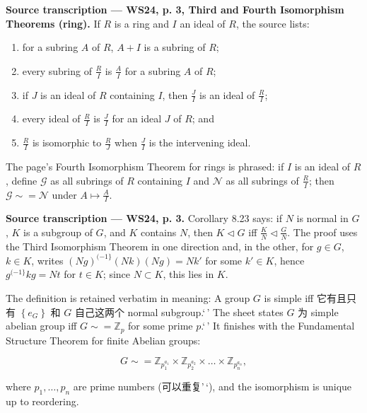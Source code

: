 \textbf{Source transcription --- WS24, p. 3, Third and Fourth Isomorphism Theorems (ring).} If \(R\) is a ring and \(I\) an ideal of \(R\), the source lists:

\begin{enumerate}
\tightlist
\item
  for a subring \(A\) of \(R\), \(A + I\) is a subring of \(R\);
\item
  every subring of \(\frac{R}{I}\) is \(\frac{A}{I}\) for a subring \(A\) of \(R\);
\item
  if \(J\) is an ideal of \(R\) containing \(I\), then \(\frac{J}{I}\) is an ideal of \(\frac{R}{I}\);
\item
  every ideal of \(\frac{R}{I}\) is \(\frac{J}{I}\) for an ideal \(J\) of \(R\); and
\item
  \(\frac{R}{I}\) is isomorphic to \(\frac{R}{J}\) when \(\frac{J}{I}\) is the intervening ideal.
\end{enumerate}

The page's Fourth Isomorphism Theorem for rings is phrased: if \(I\) is an ideal of \(R\), define \(\mathcal{G}\) as all subrings of \(R\) containing \(I\) and \(\mathcal{N}\) as all subrings of \(\frac{R}{I}\); then \(\mathcal{G} \sim = \mathcal{N}\) under \(A\mapsto\frac{A}{I}\).

\textbf{Source transcription --- WS24, p. 3.} Corollary 8.23 says: if \(N\) is normal in \(G\), \(K\) is a subgroup of \(G\), and \(K\) contains \(N\), then \(K \lhd G\) iff \(\frac{K}{N} \lhd \frac{G}{N}\). The proof uses the Third Isomorphism Theorem in one direction and, in the other, for \(g \in G\), \(k \in K\), writes \(\left( {Ng} \right)^{({- 1}\}}\left( {Nk} \right)\left( {Ng} \right) = Nk'\) for some \(k' \in K\), hence \(g^{({- 1}\}}kg = Nt\) for \(t \in K\); since \(N \subset K\), this lies in \(K\).

The definition is retained verbatim in meaning: A group \(G\) is simple iff 它有且只有 \(\left\{ e_{G} \right\}\) 和 \(G\) 自己这两个 normal subgroup.`\,' The sheet states \(G\) 为 simple abelian group iff \(G \sim = \mathbb{Z}_{p}\) for some prime \(p\).`\,' It finishes with the Fundamental Structure Theorem for finite Abelian groups:

\[G \sim = \mathbb{Z}_{p_{1}^{a_{1}}} \times \mathbb{Z}_{p_{2}^{a_{2}}} \times \ldots \times \mathbb{Z}_{p_{n}^{a_{n}}},\]

where \(p_{1},\ldots,p_{n}\) are prime numbers (可以重复'\,`), and the isomorphism is unique up to reordering.
